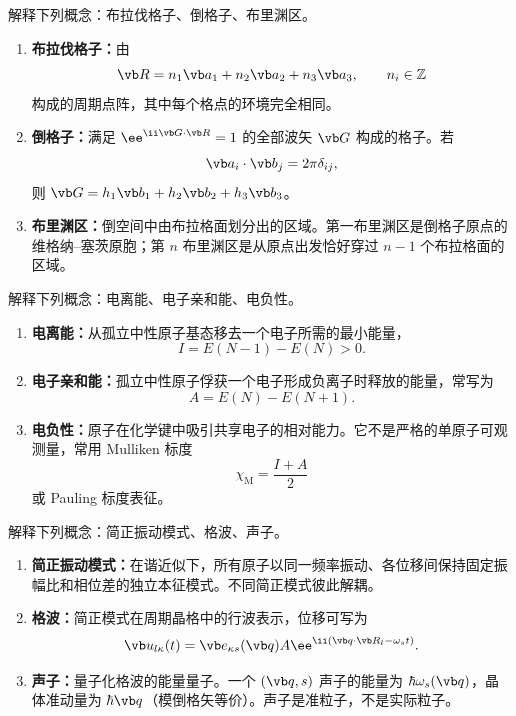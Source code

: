 \begin{question}[5 分]
解释下列概念：布拉伐格子、倒格子、布里渊区。


\begin{solution}
\begin{enumerate}
  \item \textbf{布拉伐格子：}由
  \[
    \vb R=n_1\vb a_1+n_2\vb a_2+n_3\vb a_3,
    \qquad n_i\in\mathbb Z
  \]
  构成的周期点阵，其中每个格点的环境完全相同。
  \item \textbf{倒格子：}满足 $\ee^{\ii\vb G\cdot\vb R}=1$ 的全部波矢 $\vb G$ 构成的格子。若
  \[
    \vb a_i\cdot\vb b_j=2\pi\delta_{ij},
  \]
  则 $\vb G=h_1\vb b_1+h_2\vb b_2+h_3\vb b_3$。
  \item \textbf{布里渊区：}倒空间中由布拉格面划分出的区域。第一布里渊区是倒格子原点的维格纳--塞茨原胞；第 $n$ 布里渊区是从原点出发恰好穿过 $n-1$ 个布拉格面的区域。
\end{enumerate}
\end{solution}
\end{question}

\begin{question}[5 分]
解释下列概念：电离能、电子亲和能、电负性。


\begin{solution}
\begin{enumerate}
  \item \textbf{电离能：}从孤立中性原子基态移去一个电子所需的最小能量，
  \[
    I=E(N-1)-E(N)>0.
  \]
  \item \textbf{电子亲和能：}孤立中性原子俘获一个电子形成负离子时释放的能量，常写为
  \[
    A=E(N)-E(N+1).
  \]
  \item \textbf{电负性：}原子在化学键中吸引共享电子的相对能力。它不是严格的单原子可观测量，常用 Mulliken 标度
  \[
    \chi_{\mathrm M}=\frac{I+A}{2}
  \]
  或 Pauling 标度表征。
\end{enumerate}
\end{solution}
\end{question}

\begin{question}[5 分]
解释下列概念：简正振动模式、格波、声子。


\begin{solution}
\begin{enumerate}
  \item \textbf{简正振动模式：}在谐近似下，所有原子以同一频率振动、各位移间保持固定振幅比和相位差的独立本征模式。不同简正模式彼此解耦。
  \item \textbf{格波：}简正模式在周期晶格中的行波表示，位移可写为
  \[
    \vb u_{l\kappa}(t)=\vb e_{\kappa s}(\vb q)A
    \ee^{\ii(\vb q\cdot\vb R_l-\omega_s t)}.
  \]
  \item \textbf{声子：}量子化格波的能量量子。一个 $(\vb q,s)$ 声子的能量为 $\hbar\omega_s(\vb q)$，晶体准动量为 $\hbar\vb q$（模倒格矢等价）。声子是准粒子，不是实际粒子。
\end{enumerate}
\end{solution}
\end{question}


